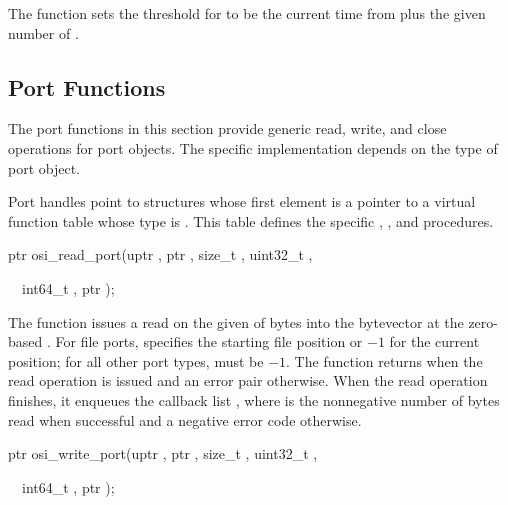 \begin{function}
\end{function}

The  function sets the threshold for
 to be the current time from
 plus the given number of .

\subsection {Port Functions}

The port functions in this section provide generic read, write, and
close operations for port objects. The specific implementation depends
on the type of port object.

Port handles point to structures whose first element is a pointer to a
virtual function table whose type is . This
table defines the specific , , and 
procedures.

\begin{function}
\codebegin
ptr osi\_read\_port(uptr , ptr , size\_t , uint32\_t ,\strut
       \     \      int64\_t , ptr );\strut
\codeend
\end{function}

The  function issues a read on the given
 of  bytes into the bytevector  at the
zero-based . For file ports,  specifies
the starting file position or $-1$ for the current position; for all
other port types,  must be $-1$.  The function returns
 when the read operation is issued and an error pair
otherwise. When the read operation finishes, it enqueues the callback
list , where  is the
nonnegative number of bytes read when successful and a negative error
code otherwise.

\begin{function}
\codebegin
ptr osi\_write\_port(uptr , ptr , size\_t , uint32\_t ,\strut
       \      \      int64\_t , ptr );\strut
\codeend\end{function}

